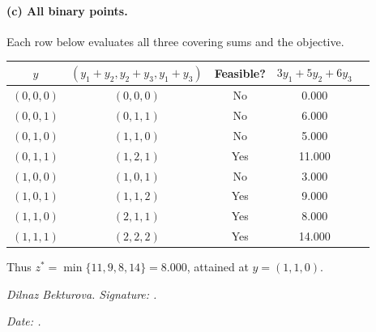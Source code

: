 \documentclass[10pt]{article}
\begin{document}
\paragraph{(c) All binary points.}
Each row below evaluates all three covering sums and the objective.
\begin{center}
\begin{tabular}{ccccc}
\toprule
$y$ & $(y_1+y_2,y_2+y_3,y_1+y_3)$ & Feasible? & $3y_1+5y_2+6y_3$\\
\midrule
$(0,0,0)$ & $(0,0,0)$ & No & 0.000\\
$(0,0,1)$ & $(0,1,1)$ & No & 6.000\\
$(0,1,0)$ & $(1,1,0)$ & No & 5.000\\
$(0,1,1)$ & $(1,2,1)$ & Yes & 11.000\\
$(1,0,0)$ & $(1,0,1)$ & No & 3.000\\
$(1,0,1)$ & $(1,1,2)$ & Yes & 9.000\\
$(1,1,0)$ & $(2,1,1)$ & Yes & 8.000\\
$(1,1,1)$ & $(2,2,2)$ & Yes & 14.000\\
\bottomrule
\end{tabular}
\end{center}
Thus $z^*=\min\{11,9,8,14\}=8.000$, attained at $y=(1,1,0)$.
\begin{flushright}
\textit{Dilnaz Bekturova. Signature: \underline{\hspace{3cm}}.}\par
\textit{Date: \underline{\hspace{3cm}}.}
\end{flushright}
\end{document}
